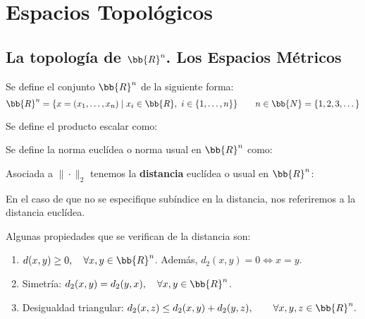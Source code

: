 \chapter{Espacios Topológicos}

\section{La topología de $\bb{R}^n$. Los Espacios Métricos}
\begin{definicion}
    Se define el conjunto $\bb{R}^n$ de la siguiente forma:
    \begin{equation*}
        \bb{R}^n = \{x=(x_1,\dots,x_n)\mid x_i\in \bb{R},~i\in \{1,\dots,n\}\}\qquad n\in \bb{N}=\{1,2,3,\dots\}
    \end{equation*}
\end{definicion}

\begin{definicion}
    Se define el producto escalar como:
\end{definicion}

\begin{definicion}
    Se define la norma euclídea o norma usual en $\bb{R}^n$ como:
\end{definicion}

Asociada a $\|\cdot\|_2$ tenemos la \textbf{distancia} euclídea o usual en $\bb{R}^n$:

\begin{notacion}
    En el caso de que no se especifique subíndice en la distancia, nos referiremos a la distancia euclídea.
\end{notacion}

Algunas propiedades que se verifican de la distancia son:
\begin{enumerate}
    \item $d(x,y)\geq 0, \quad \forall x,y\in \bb{R}^n$. Además, $d_2(x,y)=0\Longleftrightarrow x=y$.

    \item Simetría: $d_2(x,y)=d_2(y,x),\quad \forall x,y\in \bb{R}^n$.

    \item Desigualdad triangular: $d_2(x,z)\leq d_2(x,y)+d_2(y,z), \quad \quad \forall x,y,z\in \bb{R}^n.$
\end{enumerate}

